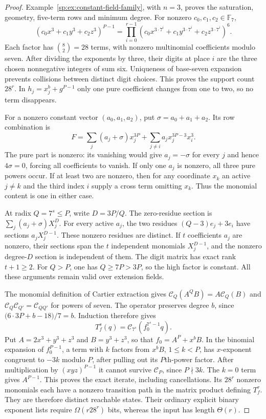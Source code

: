 \begin{proof}
Example~\ref{sp:ex:constant-field-family}, with $n=3$, proves the
saturation, geometry, five-term rows and minimum degree. For nonzero
$c_0,c_1,c_2\in\mathbb F_7$,
\[
 (c_0x^3+c_1y^3+c_2z^3)^{P-1}
  =\prod_{i=0}^{r-1}
    (c_0x^{3\cdot7^i}+c_1y^{3\cdot7^i}
                         +c_2z^{3\cdot7^i})^6.
\]
Each factor has $\binom82=28$ terms, with nonzero multinomial
coefficients modulo seven. After dividing the exponents by three,
their digits at place $i$ are the three chosen nonnegative integers
of sum six. Uniqueness of base-seven expansion prevents collisions
between distinct digit choices. This proves the support count $28^r$.
In $h_j=x_j^b+g^{P-1}$ only one pure coefficient changes from one to
two, so no term disappears.

For a nonzero constant vector $(a_0,a_1,a_2)$, put
$\sigma=a_0+a_1+a_2$. Its row combination is
\[
 F=\sum_j(a_j+\sigma)x_j^{3P}
       +\sum_{j\ne i}a_jx_j^{3P-3}x_i^3.
\]
The pure part is nonzero: its vanishing would give $a_j=-\sigma$
for every $j$ and hence $4\sigma=0$, forcing all coefficients to
vanish. If only one $a_j$ is nonzero, all three pure powers occur.
If at least two are nonzero, then for any coordinate $x_k$ an active
$j\ne k$ and the third index $i$ supply a cross term omitting $x_k$.
Thus the monomial content is one in either case.

At radix $Q=7^s\le P$, write $D=3P/Q$. The zero-residue section is
$\sum_j(a_j+\sigma)X_j^D$. For every active $a_j$, the two
residues $(Q-3)e_j+3e_i$ have sections $a_jX_j^{D-1}$.
These nonzero residues are distinct. If $t$ coefficients $a_j$ are
nonzero, their sections span the $t$ independent monomials
$X_j^{D-1}$, and the nonzero degree-$D$ section is independent of
them. The digit matrix has exact rank $t+1\ge2$.
For $Q>P$, one has $Q\ge7P>3P$, so the high factor is constant.
All these arguments remain valid over extension fields.

The monomial definition of Cartier extraction gives
$\mathcal C_Q(A^QB)=A\mathcal C_Q(B)$ and
$\mathcal C_Q\mathcal C_{Q'}=\mathcal C_{QQ'}$ for powers of seven.
The operator preserves degree $b$, since
$\bigl(6\cdot3P+b-18\bigr)/7=b$.
Induction therefore gives
\[
 T_f^s(q)=\mathcal C_{7^s}(f_0^{7^s-1}q).
\]
Put $A=2x^3+y^3+z^3$ and $B=y^3+z^3$, so that
$f_0=A^P+x^bB$. In the binomial expansion of $f_0^{P-1}$,
a term with $k$ factors from $x^bB$, $1\le k<P$, has $x$-exponent
congruent to $-3k$ modulo $P$, after pulling out its $P$th-power
factor. After multiplication by $(xyz)^{P-1}$ it cannot survive
$\mathcal C_P$, since $P\nmid3k$. The $k=0$ term gives
$A^{P-1}$. This proves the exact iterate, including cancellations.
Its $28^r$ nonzero monomials each have a nonzero transition path in
the matrix product defining $T_f^r$. They are therefore distinct
reachable states. Their ordinary explicit binary exponent lists
require $\Omega(r28^r)$ bits, whereas the input has length
$\Theta(r)$.


\end{proof}
